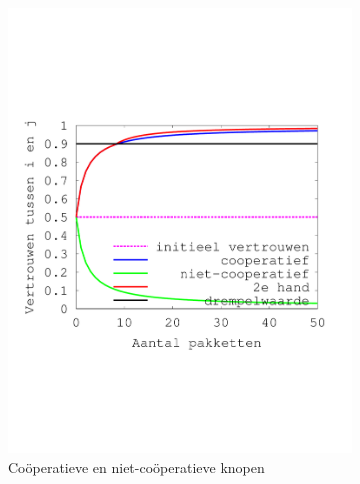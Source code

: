 \begin{figure}[ht]
\centering
\begin{subfigure}{.49\textwidth}
  \centering
  \includegraphics[width=\linewidth]{./resources/reputation-paper.pdf}
  \caption{Co\"operatieve en niet-co\"operatieve knopen}
  \label{fig:reputation-paper}
\end{subfigure}
\begin{subfigure}{.49\textwidth}
  \centering

\end{subfigure}
\end{figure}
